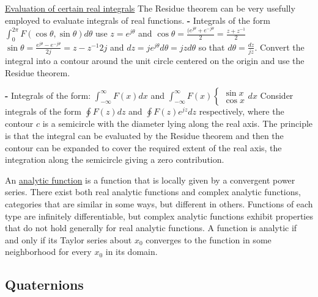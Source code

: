 \documentclass[12pt]{article}
\begin{document}
\begin{flushleft}
	\textbullet \quad \uline{Evaluation of certain real integrals} \linebreak 
	The Residue theorem can be very usefully employed to evaluate integrals of real functions. \linebreak 
	\textbf{-} Integrals of the form $\displaystyle \int_0^{2\pi} F(\cos \theta, \sin \theta) d\theta $ \linebreak 
	use $\displaystyle z=e^{j\theta}$ and $\displaystyle \cos \theta = \frac{(e^{j\theta} + e^{-j\theta}}{2} = \frac{z+z^{-1}}{2}$ \linebreak  
	$\sin \theta = \frac{e^{j\theta}-e^{-j\theta}}{2j} = {z-z^{-1}}{2j}$ \linebreak 
	and $\displaystyle dz = je^{j\theta} d\theta = jz d \theta$ \linebreak 
	so that $\displaystyle d\theta = \frac{dz}{jz}$. Convert the integral into a contour around the unit circle centered on the origin and use the Residue theorem. \linebreak 
	
	\textbf{-} Integrals of the form: $\displaystyle \int_{-\infty}^{\infty} F(x) dx$ and $\displaystyle \int_{-\infty}^{\infty} F(x) \begin{cases} \sin x \\ \cos x \end{cases} dx $ \linebreak 
	Consider integrals of the form $\displaystyle \oint F(z) dz$ and $\oint F(z) e^{jz} dz$ respectively, where the contour $c$ is a semicircle with the diameter lying along the real axis. The principle is that the integral can be evaluated by the Residue theorem and then the contour can be expanded to cover the required extent of the real axis, the integration along the semicircle giving a zero contribution. \linebreak 	
	
	\textbullet \quad An \uline{analytic function} is a function that is locally given by a convergent power series. There exist both real analytic functions and complex analytic functions, categories that are similar in some ways, but different in others. Functions of each type are infinitely differentiable, but complex analytic functions exhibit properties that do not hold generally for real analytic functions. A function is analytic if and only if its Taylor series about $x_0$ converges to the function in some neighborhood for every $x_0$ in its domain. \linebreak 
		
	\subsection{Quaternions}
	

\end{flushleft}
\end{document}
